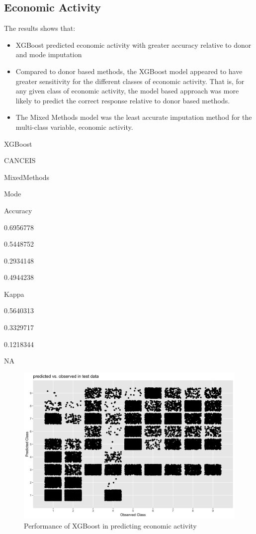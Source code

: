 \documentclass[]{book}
\providecommand{\tightlist}{%
  \setlength{\itemsep}{0pt}\setlength{\parskip}{0pt}}
\begin{document}
\subsection{Economic Activity}\label{economic-activity}

The results shows that:

\begin{itemize}
\tightlist
\item
  XGBoost predicted economic activity with greater accuracy relative to
  donor and mode imputation\\
\item
  Compared to donor based methods, the XGBoost model appeared to have
  greater sensitivity for the different classes of economic activity.
  That is, for any given class of economic activity, the model based
  approach was more likely to predict the correct response relative to
  donor based methods.
\item
  The Mixed Methods model was the least accurate imputation method for
  the multi-class variable, economic activity.
\end{itemize}

XGBoost

CANCEIS

MixedMethods

Mode

Accuracy

0.6956778

0.5448752

0.2934148

0.4944238

Kappa

0.5640313

0.3329717

0.1218344

NA

\begin{figure}
\centering
\includegraphics{images/EAXGqplot.png}
\caption{Performance of XGBoost in predicting economic activity}
\end{figure}
\end{document}
